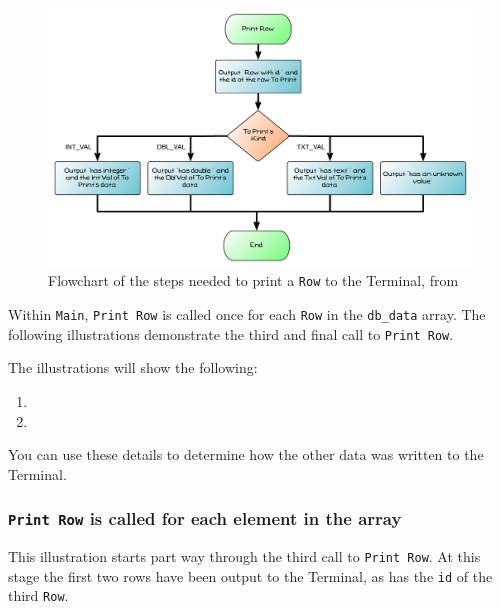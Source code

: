 \begin{figure}[htbp]
   \centering
   \includegraphics[width=\textwidth]{./topics/type-decl/diagrams/PrintRowFlow} 
   \caption{Flowchart of the steps needed to print a \texttt{Row} to the Terminal, from }
   \label{fig:print-row-flow-understanding}
\end{figure}

Within \texttt{Main}, \texttt{Print Row} is called once for each \texttt{Row} in the \texttt{db\_data} array. The following illustrations demonstrate the third and final call to \texttt{Print Row}.

The illustrations will show the following:
\begin{enumerate}
  \item {}
  \item {}
\end{enumerate}

You can use these details to determine how the other data was written to the Terminal. 

\clearpage
\subsubsection{\texttt{Print Row} is called for each element in the array} %
\label{ssub:print_row_is_called_for_each_element_in_the_array}

This illustration starts part way through the third call to \texttt{Print Row}. At this stage the first two rows have been output to the Terminal, as has the \texttt{id} of the third \texttt{Row}.

